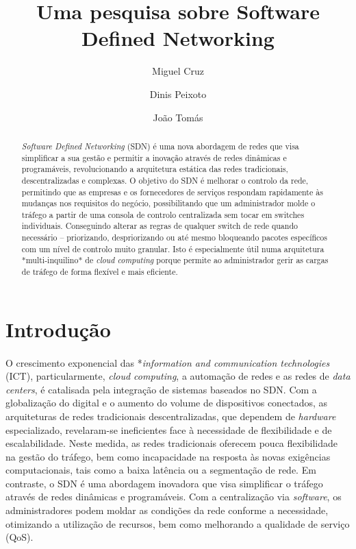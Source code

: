 \documentclass{llncs}
\begin{document}
\mainmatter
\title{Uma pesquisa sobre Software Defined Networking}


\author{Miguel Cruz \and Dinis Peixoto \and João Tomás}



\date{}

\maketitle
\begin{abstract}
    \textit {Software Defined Networking} (SDN) é uma nova abordagem de redes que visa simplificar a sua gestão e permitir a inovação através de redes dinâmicas e programáveis,  revolucionando a arquitetura estática das redes tradicionais, descentralizadas e complexas. 
    O objetivo do SDN é melhorar o controlo da rede, permitindo que as empresas e os fornecedores de serviços respondam rapidamente às mudanças nos requisitos do negócio, possibilitando que um administrador molde o tráfego a partir de uma consola de controlo centralizada sem tocar em switches individuais. Conseguindo alterar as regras de qualquer switch de rede quando necessário – priorizando, despriorizando ou até mesmo bloqueando pacotes específicos com um nível de controlo muito granular.
    Isto é especialmente útil numa arquitetura *multi-inquilino* de \textit {cloud computing}  porque permite ao administrador gerir as cargas de tráfego de forma flexível e mais eficiente.
\end{abstract}

\section{Introdução}

\paragraph{} O crescimento exponencial das *\textit {information and communication technologies} (ICT), particularmente, \textit {cloud computing}, a automação de redes e as redes de \textit {data centers}, é catalisada pela integração de sistemas baseados no SDN. \cite{paper1}
 Com a globalização do digital e o aumento do volume de dispositivos conectados, as arquiteturas de redes tradicionais descentralizadas, que dependem de \textit {hardware} especializado, revelaram-se ineficientes face à necessidade de flexibilidade e de escalabilidade. 
 Neste medida, as redes tradicionais oferecem pouca flexibilidade na gestão do tráfego, bem como incapacidade na resposta às novas exigências computacionais, tais como a baixa latência ou a segmentação de rede. 
 Em contraste, o SDN é uma abordagem inovadora que visa simplificar o tráfego através de redes dinâmicas e programáveis. 
 Com a centralização via \textit {software}, os administradores podem moldar as condições da rede conforme a necessidade, otimizando a utilização de recursos, bem como melhorando a qualidade de serviço (QoS).
\end{document}
